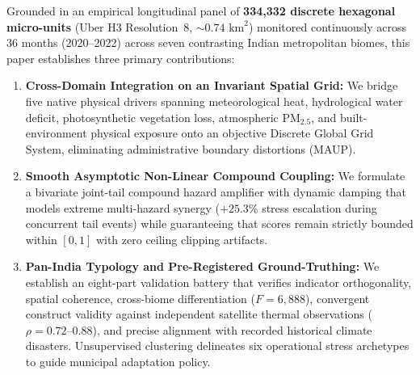 Grounded in an empirical longitudinal panel of \textbf{334,332 discrete hexagonal micro-units} (Uber H3 Resolution~8, $\sim 0.74\text{ km}^2$) monitored continuously across 36 months (2020--2022) across seven contrasting Indian metropolitan biomes, this paper establishes three primary contributions:
\begin{enumerate}
    \item \textbf{Cross-Domain Integration on an Invariant Spatial Grid:} We bridge five native physical drivers spanning meteorological heat, hydrological water deficit, photosynthetic vegetation loss, atmospheric $\text{PM}_{2.5}$, and built-environment physical exposure onto an objective Discrete Global Grid System, eliminating administrative boundary distortions (MAUP).
    \item \textbf{Smooth Asymptotic Non-Linear Compound Coupling:} We formulate a bivariate joint-tail compound hazard amplifier with dynamic damping that models extreme multi-hazard synergy ($+25.3\%$ stress escalation during concurrent tail events) while guaranteeing that scores remain strictly bounded within $[0, 1]$ with zero ceiling clipping artifacts.
    \item \textbf{Pan-India Typology and Pre-Registered Ground-Truthing:} We establish an eight-part validation battery that verifies indicator orthogonality, spatial coherence, cross-biome differentiation ($F = 6,888$), convergent construct validity against independent satellite thermal observations ($\rho = 0.72\text{--}0.88$), and precise alignment with recorded historical climate disasters. Unsupervised clustering delineates six operational stress archetypes to guide municipal adaptation policy.
\end{enumerate}

